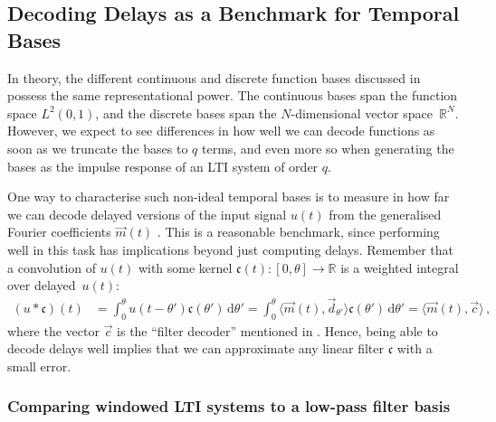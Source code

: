 \subsection{Decoding Delays as a Benchmark for Temporal Bases}
\label{sec:comparing_temporal_bases}

In theory, the different continuous and discrete function bases discussed in  possess the same representational power.
The continuous bases span the function space $L^2(0, 1)$, and the discrete bases span the $N$-dimensional vector space~$\mathbb{R}^N$.
However, we expect to see differences in how well we can decode functions as soon as we truncate the bases to $q$ terms, and even more so when generating the bases as the impulse response of an LTI system of order $q$.

One way to characterise such non-ideal temporal bases is to measure in how far we can decode delayed versions of the input signal $u(t)$ from the generalised Fourier coefficients $\vec m(t)$ \citep[cf.][]{voelker2018improving}.
This is a reasonable benchmark, since performing well in this task has implications beyond just computing delays. 
Remember that a convolution of $u(t)$ with some kernel $\mathfrak{c}(t) : [0, \theta] \longrightarrow \mathbb{R}$ is a weighted integral over delayed~$u(t)$:
\begin{align*}
	(u \ast \mathfrak{c})(t)
		&= \int_{0}^\theta \!\! u(t - \theta') \mathfrak{c}(\theta') \, \mathrm{d}\theta'
		 = \int_{0}^\theta \!\! \langle \vec m(t), \vec d_{\theta'} \rangle \mathfrak{c}(\theta') \, \mathrm{d}\theta'
		 = \langle \vec m(t), \vec c \rangle \,,
\end{align*}
where the vector $\vec c$ is the \enquote{filter decoder} mentioned in .
Hence, being able to decode delays well implies that we can approximate any linear filter $\mathfrak{c}$ with a small error.

\subsubsection{Comparing windowed LTI systems to a low-pass filter basis}


